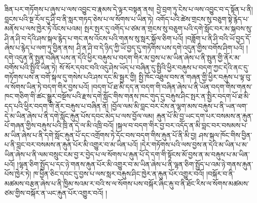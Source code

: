 ཟིན་པར་གཏོགས་པ་ཞུས་པ་ལས་འབྱུང་བ་རྣམས་དེ་ལྟར་བསྟན་ནས། བྱེ་བྲག་ཏུ་ངེས་པ་ལས་འབྱུང་བ་ད་སྟོན་པ་ནི། བླངས་པའི་སྔ་རོལ་དུ་ཤི་བ་ནི་སླར་གཏད་ཅེས་པ་ལ་སོགས་པ་ཡིན་ཏེ། འགོད་པའི་ཚེས་གྲངས་སུ་བཅུག་སྟེ་རྙེད་པ་མནོས་པ་ལས་ཁྱེར་ཏེ་འོངས་པའམ། སྤར་སྤར་དུ་འགོད་པ་ཙམ་ན་གྲངས་སུ་བཅུག་པའི་དགེ་སློང་བར་མ་སྐབས་སུ་ཤི་ན་ཤི་བ་དེའི་ཤས་སྐལ་རྙེད་པ་གང་ནས་འོངས་པའི་གནས་སུ་སླར་སྐྱོལ་ཅིག་པའོ། །བཟློག་པ་ནི་ཤི་བའི་ཡོ་བྱད་དོ་ཞེས་པ་རྙེད་པ་ལག་ཏུ་བྱིན་ནས། ཤི་ན་ཤི་བ་དེ་ཉིད་ཀྱི་ཡོ་བྱད་དུ་གཏོགས་པས་དགེ་འདུན་གྱིས་བགོས་ཤིག་པའོ། །དགེ་འདུན་ནི་སྤུན་བཞིན་པས་ན་དེའི་ཕྱིར་བརྐུས་པ་བདག་གིར་མ་བྱས་པ་མ་ཡིན་ཞེས་པ་ནི་སྤུན་གྱི་ནོར་མ་བགོས་པའི་སྤྱིའི་ཡིན་ཏེ། སོ་སོར་དབང་བའི་འདུ་ཤེས་ཡོད་པ་བཞིན་དུ་སྤྱིའི་ཕྱིར་བརྐུས་པ་བདག་ཀྱང་དེའི་ནང་དུ་གཏོགས་པས་ན་བགོ་སྐལ་དུ་གསེས་པའི་ཤས་དང་མི་སྦྱར་གྱི། སྤྱི་ཁོང་འཐུལ་བས་ན་གཞན་གྱི་ཕྱིར་བརྐུས་པ་ལྟ་བུ་ལ་སོགས་ཡིན་ཏེ་བདག་གིར་བྱས་པའོ། །བདག་པོ་ཐ་མི་དད་ན་བདག་གི་བཞིན་ཞེས་པ་ནི་ཡོན་བདག་གིས་གནས་ཁང་གཅིག་གི་ཚང་སྒྱུར་བསྔོས་པའི་རྫས་དགེ་སློང་གིས་གནས་ཁང་གུད་དུ་བརྐུས་ཤིང་སྤར་ན་སྤྱིར་བདག་པོ་ཐ་མི་དད་པའི་ཕྱིར་བདག་གི་ནོར་བརྐུས་པ་བཞིན་ནོ། །བྱོལ་ལམ་མི་བླང་བར་ངེས་ན་ལྷག་མས་བརྐུས་པ་ནི་ཡན་ལག་དེ་མ་ཡིན་ཞེས་པ་ནི་དགེ་སློང་རྐུན་པོས་དབང་མེད་པ་ལས་བྱོལ་ལམ། རྐུན་པོ་མི་བྱ་ཡང་དག་པར་བསམས་ན་རྐུན་པོ་གཞན་གྱིས་བརྐུས་པའི་ཁྲི་ན་དེ་ལ་མི་འཁྲི་བའོ། །སྐལ་བ་བདག་གིར་བྱ་བར་འདོད་ན་མི་བླང་བར་བསམས་པ་མ་ཡིན་ཞེས་པ་ནི་དགེ་སློང་རྐུན་པོ་དང་འགྲོགས་ཏེ་དོང་བས་བདག་གིས་རྐུན་པོ་ནི་མི་བྱ། ཤས་སྐལ་ཁོང་གིས་བྱིན་པ་ནི་བླང་བར་བསམས་ན་རྐུན་པོར་མི་འགྱུར་བ་མ་ཡིན་པའོ། །དེར་གཏོགས་པའི་ལས་བྱས་ན་དེའི་མ་ཡིན་པ་མ་ཡིན་ཞེས་པ་ནི་ལམ་བསྲུང་ངམ་བྱ་ར་བྱེད་པ་ལ་སོགས་པ་རྐུན་པོ་དེ་དག་གི་སྟོངས་མོ་བྱས་ན་མ་བརྐུས་པ་མ་ཡིན་པའོ། །ལྷན་ཅིག་སྤྱོད་པ་དང་ཉེ་གནས་རྐུན་པོར་མི་འགྱུར་བ་མ་ཡིན་ཞེས་པ་ནི་ལྷན་ཅིག་སྤྱོད་པ་འམ་ཉེ་གནས་རྐུན་པོས་ཁྱེར་ཏེ། ཁ་ཕྱིན་ཅིང་དབང་དུ་བྱས་པ་ལས་སླར་བརྐུས་ཤིང་ཁྱེར་ན་རྐུན་པོར་འགྱུར་བའོ། །བསྐོར་བ་ནི་མཚམས་བརྩན་ཞེས་པ་ནི་ཁྱིམ་སའམ་ར་བའི་ས་ལ་སོགས་པས་བསྐོར་ཞིང་རྐུ་བ་ནི་ཐོང་རིས་ལ་སོགས་མཚམས་ཙམ་གྱིས་བསྐོར་ན་ཡང་རྐུན་པོར་འགྱུར་བའོ། །
